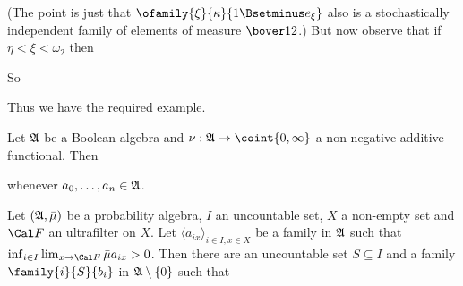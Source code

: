 {

\noindent (The point is just that
$\ofamily{\xi}{\kappa}{1\Bsetminus e_{\xi}}$ also is a stochastically
independent family of elements of measure $\bover12$.)
But now observe that if $\eta<\xi<\omega_2$ then


\noindent So


\noindent Thus we have the required example.
}%

 Let $\frak A$ be a Boolean algebra and
$\nu:\frak A\to\coint{0,\infty}$ a non-negative additive functional.   Then


\noindent whenever $a_0,\ldots,a_n\in\frak A$.


 Let $(\frak A,\bar\mu)$ be a
probability algebra, $I$ an uncountable set, $X$ a non-empty set and
$\Cal F$ an ultrafilter on $X$.
Let $\langle a_{ix}\rangle_{i\in I,x\in X}$ be a
family in $\frak A$ such that
$\inf_{i\in I}\lim_{x\to\Cal F}\bar\mu a_{ix}>0$.
Then there are an uncountable set $S\subseteq I$ and a family
$\family{i}{S}{b_i}$ in $\frak A\setminus\{0\}$ such that


